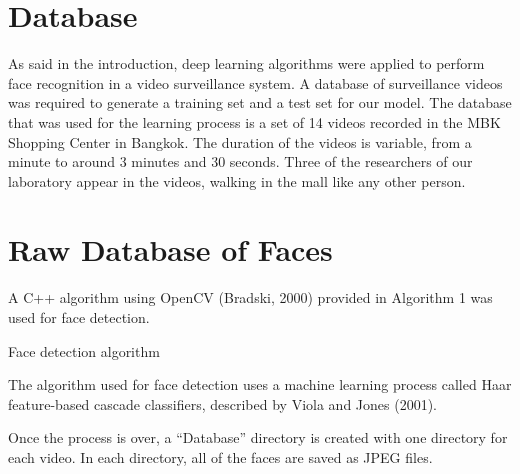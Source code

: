\section{Database}
As said in the introduction, deep learning algorithms were applied to perform face recognition in a video surveillance system. A database of surveillance videos was required to generate a training set and a test set for our model.
The database that was used for the learning process is a set of 14 videos recorded in the MBK Shopping Center in Bangkok. The duration of the videos is variable, from a minute to around 3 minutes and 30 seconds. Three of the researchers of our laboratory appear in the videos, walking in the mall like any other person.

\section{Raw Database of Faces}

A C++ algorithm using OpenCV (Bradski, 2000) provided in Algorithm 1 was used for face detection.

\begin{algorithm}[H]
 \caption{Face detection algorithm}
\end{algorithm}

The algorithm used for face detection uses a machine learning process called Haar feature-based cascade classifiers, described by Viola and Jones (2001).

Once the process is over, a \enquote{Database} directory is created with one directory for each video. In each directory, all of the faces are saved as JPEG files.

